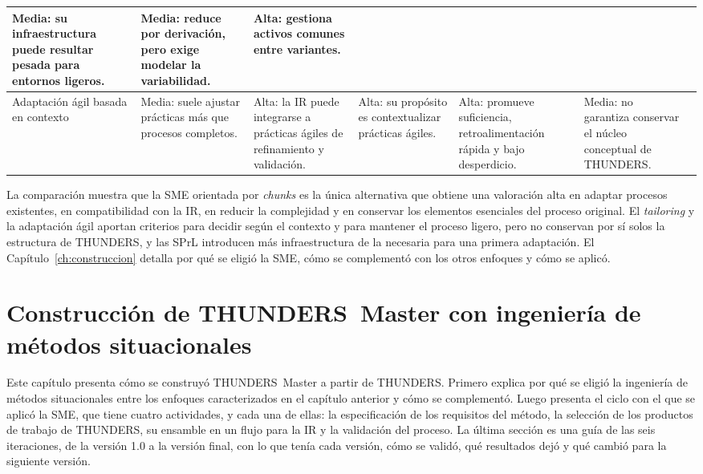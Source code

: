 \documentclass[12pt,letterpaper,oneside]{report}
\begin{document}
\begin{table}[H]
\begin{tabularx}{\textwidth}{@{}L{2.3cm} Y Y Y Y Y L{1.4cm}@{}}
Media: su infraestructura puede resultar pesada para entornos ligeros. &
Media: reduce por derivación, pero exige modelar la variabilidad. &
Alta: gestiona activos comunes entre variantes. &
\cite{kuhrmann2016} \\
\midrule
Adaptación ágil basada en contexto &
Media: suele ajustar prácticas más que procesos completos. &
Alta: la IR puede integrarse a prácticas ágiles de refinamiento y validación. &
Alta: su propósito es contextualizar prácticas ágiles. &
Alta: promueve suficiencia, retroalimentación rápida y bajo desperdicio. &
Media: no garantiza conservar el núcleo conceptual de THUNDERS. &
\cite{campanelli2015agile} \\
\bottomrule
\end{tabularx}
\end{table}


La comparación muestra que la SME orientada por \textit{chunks} es la única
alternativa que obtiene una valoración alta en adaptar procesos existentes, en
compatibilidad con la IR, en reducir la complejidad y en conservar los elementos
esenciales del proceso original. El \textit{tailoring} y la adaptación ágil
aportan criterios para decidir según el contexto y para mantener el proceso
ligero, pero no conservan por sí solos la estructura de THUNDERS, y las SPrL
introducen más infraestructura de la necesaria para una primera adaptación. El
Capítulo~\ref{ch:construccion} detalla por qué se eligió la SME, cómo se
complementó con los otros enfoques y cómo se aplicó.

\chapter{Construcción de THUNDERS~Master con ingeniería de métodos situacionales}
\label{ch:construccion}

Este capítulo presenta cómo se construyó THUNDERS~Master a partir de THUNDERS. 
Primero explica por qué se eligió la ingeniería
de métodos situacionales entre los enfoques caracterizados en el capítulo
anterior y cómo se complementó. Luego presenta el ciclo con el que se aplicó la SME, que
tiene cuatro actividades, y cada una de ellas: la especificación de los
requisitos del método, la selección de los productos de trabajo de THUNDERS, su ensamble
en un flujo para la IR y la validación del proceso. La última sección es una guía
de las seis iteraciones, de la versión 1.0 a la versión final, con lo que tenía
cada versión, cómo se validó, qué resultados dejó y qué cambió para la
siguiente versión.
\end{document}

